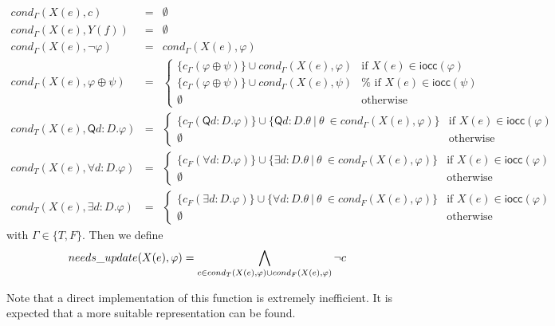 \begin{equation*}
\begin{array}{lll}
cond_{\Gamma }(X(e),c) & = & \emptyset \\
cond_{\Gamma }(X(e),Y(f)) & = & \emptyset \\
cond_{\Gamma }(X(e),\lnot \varphi ) & = & cond_{\Gamma }(X(e),\varphi ) \\
cond_{\Gamma }(X(e),\varphi \oplus \psi ) & = & \left\{
\begin{array}{cc}
\{c_{\Gamma }(\varphi \oplus \psi )\}\cup cond_{\Gamma }(X(e),\varphi ) &
\text{if }X(e)\in \mathsf{iocc}(\varphi ) \\
\{c_{\Gamma }(\varphi \oplus \psi )\}\cup cond_{\Gamma }(X(e),\psi ) & \text{%
if }X(e)\in \mathsf{iocc}(\psi ) \\
\emptyset & \text{otherwise}%
\end{array}%
\right. \\
cond_{T}(X(e),\mathsf{Q}d:{D}.\varphi ) & = & \left\{
\begin{array}{cc}
\{c_{T}(\mathsf{Q}d:{D}.\varphi )\}\cup \{\mathsf{Q}d:{D}.\theta \ |\ \theta
\ \in cond_{\Gamma }(X(e),\varphi )\} & \text{if }X(e)\in \mathsf{iocc}%
(\varphi ) \\
\emptyset & \text{otherwise}%
\end{array}%
\right. \\
cond_{T}(X(e),\mathsf{\forall }d:{D}.\varphi ) & = & \left\{
\begin{array}{cc}
\{c_{F}(\mathsf{\forall }d:{D}.\varphi )\}\cup \{\mathsf{\exists }d:{D}%
.\theta \ |\ \theta \ \in cond_{F}(X(e),\varphi )\} & \text{if }X(e)\in
\mathsf{iocc}(\varphi ) \\
\emptyset & \text{otherwise}%
\end{array}%
\right. \\
cond_{T}(X(e),\mathsf{\exists }d:{D}.\varphi ) & = & \left\{
\begin{array}{cc}
\{c_{F}(\mathsf{\exists }d:{D}.\varphi )\}\cup \{\mathsf{\forall }d:{D}%
.\theta \ |\ \theta \ \in cond_{F}(X(e),\varphi )\} & \text{if }X(e)\in
\mathsf{iocc}(\varphi ) \\
\emptyset & \text{otherwise}%
\end{array}%
\right.%
\end{array}%
\end{equation*}%
with $\Gamma \in \{T,F\}$. Then we define%
\begin{equation*}
needs\_update(X(e),\varphi )=\dbigwedge\limits_{c\in cond_{T}(X(e),\varphi
)\cup cond_{F}(X(e),\varphi )}\lnot c
\end{equation*}

\begin{remark}
Note that a direct implementation of this function is extremely inefficient.
It is expected that a more suitable representation can be found.\newpage
\end{remark}
